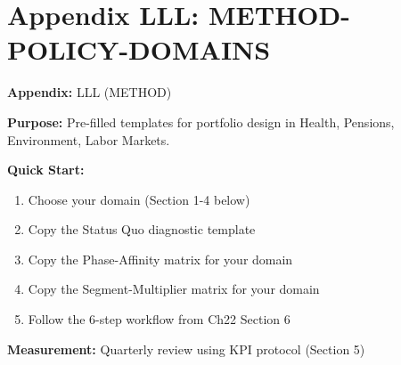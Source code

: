 %
%
%
%
%
%

\newpage
\section*{Appendix LLL: METHOD-POLICY-DOMAINS}
\label{app:method-policy-domains}


\begin{tcolorbox}[colback=blue!5!white, colframe=blue!75!black, title=Quick Reference]
\textbf{Appendix:} LLL (METHOD)

\small
\textbf{Purpose:} Pre-filled templates for portfolio design in Health, Pensions, Environment, Labor Markets.

\textbf{Quick Start:}
\begin{enumerate}[nosep]
\item Choose your domain (Section 1-4 below)
\item Copy the Status Quo diagnostic template
\item Copy the Phase-Affinity matrix for your domain
\item Copy the Segment-Multiplier matrix for your domain
\item Follow the 6-step workflow from Ch22 Section 6
\end{enumerate}

\textbf{Measurement:} Quarterly review using KPI protocol (Section 5)
\end{tcolorbox}


